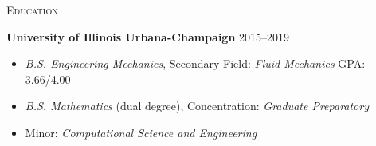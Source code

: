 \documentclass[10pt]{article}
\begin{document}
%
%
\begin{multicols}{2}
\textsc{\small Education}
\columnbreak

\textbf{University of Illinois Urbana-Champaign} \hfill 2015--2019

\vspace{-1.75em}
\begin{itemize}[label= ]
    \setlength\itemsep{-0.25em}
    \item {\sl B.S. Engineering Mechanics}, Secondary Field: {\sl Fluid Mechanics} \hfill GPA: 3.66/4.00
    \item {\sl B.S. Mathematics} (dual degree), Concentration: {\sl Graduate Preparatory}
    \item  Minor: {\sl Computational Science and Engineering}
\end{itemize}
\vspace{-2.0em}

\end{multicols}
\vspace{-1.5em}
\end{document}
